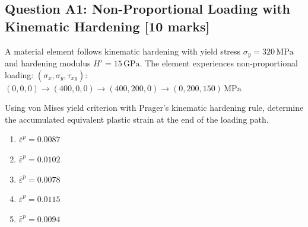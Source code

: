\documentclass[12pt,a4paper]{article}
\begin{document}
\begin{questionbox}
\subsection*{Question A1: Non-Proportional Loading with Kinematic Hardening [10 marks]}
A material element follows kinematic hardening with yield stress $\sigma_y = 320\,\text{MPa}$ 
and hardening modulus $H' = 15\,\text{GPa}$. The element experiences non-proportional loading:
$(\sigma_x, \sigma_y, \tau_{xy})$: $(0,0,0) \to (400,0,0) \to (400,200,0) \to (0,200,150)\,\text{MPa}$

\begin{center}
\end{center}

Using von Mises yield criterion with Prager's kinematic hardening rule, determine the 
accumulated equivalent plastic strain at the end of the loading path.

\begin{mcqbox}
\begin{enumerate}[label=(\Alph*),leftmargin=*]
    \item $\bar{\varepsilon}^p = 0.0087$
    \item $\bar{\varepsilon}^p = 0.0102$
    \item $\bar{\varepsilon}^p = 0.0078$
    \item $\bar{\varepsilon}^p = 0.0115$
    \item $\bar{\varepsilon}^p = 0.0094$
\end{enumerate}
\end{mcqbox}
\end{questionbox}
\end{document}
